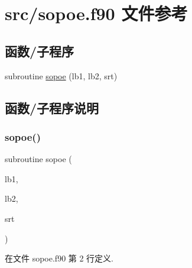 \hypertarget{sopoe_8f90}{}\section{src/sopoe.f90 文件参考}
\label{sopoe_8f90}
\subsection*{函数/子程序}
\begin{DoxyCompactItemize}
\item 
subroutine \mbox{\hyperlink{sopoe_8f90_afebe74f4939fed579cd50b895c3c7b66}{sopoe}} (lb1, lb2, srt)
\end{DoxyCompactItemize}


\subsection{函数/子程序说明}
\mbox{\label{sopoe_8f90_afebe74f4939fed579cd50b895c3c7b66}} 
\subsubsection{\texorpdfstring{sopoe()}{sopoe()}}
{\footnotesize\ttfamily subroutine sopoe (\begin{DoxyParamCaption}\item[{}]{lb1,  }\item[{}]{lb2,  }\item[{}]{srt }\end{DoxyParamCaption})}



在文件 sopoe.\+f90 第 2 行定义.

